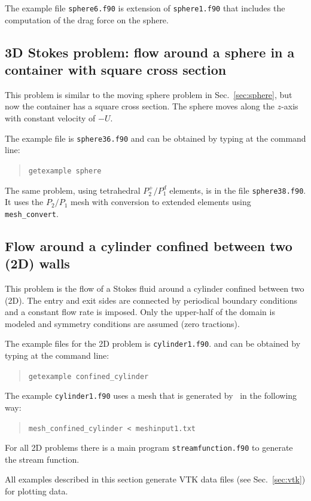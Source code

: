 The example file \texttt{sphere6.f90} is extension of \texttt{sphere1.f90}
that includes the computation of the drag force on the sphere.

\subsection{3D Stokes problem: flow around a sphere in
 a container with square cross section}
\label{sec:sphere3D}

This problem is similar to the moving sphere problem in Sec.~\ref{sec:sphere},
but now the container has a square cross section. The sphere moves along the
$z$-axis with constant velocity of $-U$.

The example file is \texttt{sphere36.f90} and can be obtained by typing at the
command line:
\begin{quote}
   \texttt{getexample sphere}
\end{quote}

The same problem, using tetrahedral $P_2^+/P_1^d$ elements, is in the file
\texttt{sphere38.f90}. It uses the $P_2/P_1$ mesh
with conversion to extended elements using \texttt{mesh\_convert}.

\subsection{Flow around a cylinder confined between two (2D) walls}
\label{sec:cylinderStokes}

This problem is the 
flow of a Stokes fluid around a cylinder confined between two (2D).
The entry and exit sides are connected by periodical boundary conditions
and a constant flow rate is imposed.
Only the upper-half of the domain is modeled and symmetry conditions are
assumed (zero tractions).

The example files for the 2D problem is \texttt{cylinder1.f90}.
and can be obtained by typing at the
command line:
\begin{quote}
   \texttt{getexample confined\_cylinder}
\end{quote}
The example
\texttt{cylinder1.f90} uses a mesh that is generated by \tfem\ in the
following way:
\begin{quote}
   \texttt{mesh\_confined\_cylinder < meshinput1.txt}
\end{quote}

For all 2D problems there is a main program \texttt{streamfunction.f90} to
generate the stream function.

All examples described in this section generate VTK data files (see
Sec.~\ref{sec:vtk}) for plotting data.


